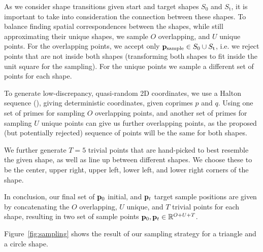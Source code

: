 As we consider shape transitions given start and target shapes $S_\text{0}$ and
$S_\text{t}$, it is important to take into consideration the connection between
these shapes. To balance finding spatial correspondences between the shapes,
while still approximating their unique shapes, we sample $O$ overlapping, and
$U$ unique points. For the overlapping points, we accept only
$\vb{p}_\text{sample} \in S_\text{0} \cup S_\text{t}$, i.e. we reject points
that are not inside both shapes (transforming both shapes to fit inside the unit
square for the sampling). For the unique points we sample a different set of
points for each shape. 

To generate low-discrepancy, quasi-random 2D coordinates, we use a Halton
sequence (\cite{halton}), giving deterministic coordinates, given coprimes $p$
and $q$. Using one set of primes for sampling $O$ overlapping points, and
another set of primes for sampling $U$ unique points can give us further
overlapping points, as the proposed (but potentially rejected) sequence of
points will be the same for both shapes.

We further generate $T=5$ trivial points that are hand-picked to best resemble
the given shape, as well as line up between different shapes. We choose these to
be the center, upper right, upper left, lower left, and lower right corners of
the shape. 

In conclusion, our final set of $\vb{p}_0$ initial, and $\vb{p}_t$ target sample
positions are given by concatenating the $O$ overlapping, $U$ unique, and $T$
trivial points for each shape, resulting in two set of sample points $\vb{p}_0,
\vb{p}_t \in \mathbb{R}^{O+U+T}$.

Figure~\ref{fig:sampling} shows the result of our sampling strategy for
a triangle and a circle shape.

